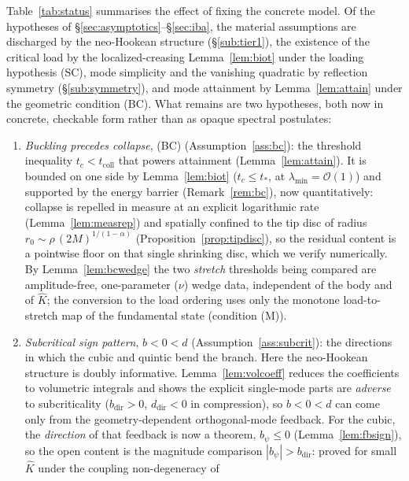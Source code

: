Table~\ref{tab:status} summarises the effect of fixing the concrete model. Of the hypotheses of
\S\ref{sec:asymptotics}--\S\ref{sec:iba}, the material assumptions are discharged by the neo-Hookean structure
(\S\ref{sub:tier1}), the existence of the critical load by the localized-creasing Lemma~\ref{lem:biot} under the
loading hypothesis (SC), mode simplicity and the vanishing quadratic by reflection symmetry (\S\ref{sub:symmetry}), and
mode attainment by Lemma~\ref{lem:attain} under the geometric condition (BC). What remains are two hypotheses, both now
in concrete, checkable form rather than as opaque spectral postulates:
\begin{enumerate}
    \item \emph{Buckling precedes collapse}, (BC) (Assumption~\ref{ass:bc}): the threshold inequality
          $t_c<t_{\mathrm{coll}}$ that powers attainment (Lemma~\ref{lem:attain}). It is bounded on one side by
          Lemma~\ref{lem:biot} ($t_c\le t_*$, at $\lambda_{\min}=\mathcal{O}(1)$) and supported by the energy barrier
          (Remark~\ref{rem:bc}), now quantitatively: collapse is repelled in measure at an explicit logarithmic rate
          (Lemma~\ref{lem:measrep}) and spatially confined to the tip disc of radius
          $r_0\sim\rho\,(2M)^{1/(1-\alpha)}$ (Proposition~\ref{prop:tipdisc}), so the residual content is a pointwise
          floor on that single shrinking disc, which we verify numerically. By Lemma~\ref{lem:bcwedge} the two
          \emph{stretch} thresholds being compared are amplitude-free, one-parameter ($\nu$) wedge data, independent
          of the body and of $\hat K$; the conversion to the load ordering uses only the monotone load-to-stretch map
          of the fundamental state (condition (M)).
    \item \emph{Subcritical sign pattern}, $b<0<d$ (Assumption~\ref{ass:subcrit}): the directions in which the cubic and
          quintic bend the branch. Here the neo-Hookean structure is doubly informative. Lemma~\ref{lem:volcoeff}
          reduces the coefficients to volumetric integrals and shows the explicit single-mode parts are \emph{adverse}
          to subcriticality ($b_{\mathrm{dir}}>0$, $d_{\mathrm{dir}}<0$ in compression), so $b<0<d$ can come only from
          the geometry-dependent orthogonal-mode feedback. For the cubic, the \emph{direction} of that feedback is now
          a theorem, $b_\psi\le0$ (Lemma~\ref{lem:fbsign}), so the open content is the magnitude comparison
          $|b_\psi|>b_{\mathrm{dir}}$: proved for small $\hat K$ under the coupling non-degeneracy of

\end{enumerate}
